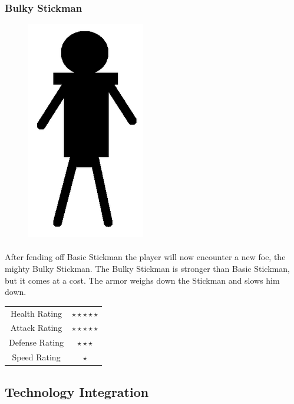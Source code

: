 \subsubsection{Bulky Stickman}

\begin{figure}[H]
	\centering
	\includegraphics{../images/castle-defense-bulky-stickman.png}
\end{figure}

\paragraph{} After fending off Basic Stickman the player will now encounter a new foe, the mighty Bulky Stickman. The Bulky Stickman is stronger than Basic Stickman, but it comes at a cost. The armor weighs down the Stickman and slows him down.

\begin{table}[H]
	\centering
	\begin{tabular}{c >{\(}c<{\)}}
		Health Rating	&	\star \star \star \star \star\\
		Attack Rating	&	\star \star \star \star \star\\
		Defense Rating	&	\star \star \star\\
		Speed Rating	&	\star
	\end{tabular}
\end{table}

\subsection{Technology Integration}


